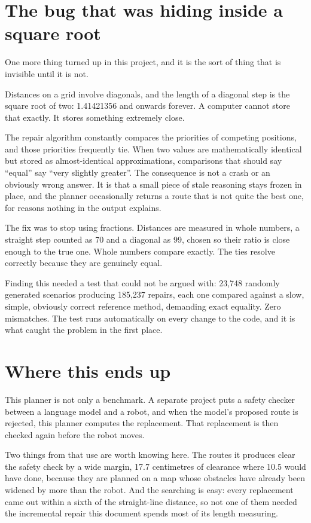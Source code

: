 \documentclass[11pt,a4paper]{article}
\begin{document}
\section{The bug that was hiding inside a square root}

One more thing turned up in this project, and it is the sort of thing that is invisible until it is not.

Distances on a grid involve diagonals, and the length of a diagonal step is the square root of two: 1.41421356 and onwards forever. A computer cannot store that exactly. It stores something extremely close.

The repair algorithm constantly compares the priorities of competing positions, and those priorities frequently tie. When two values are mathematically identical but stored as almost-identical approximations, comparisons that should say ``equal'' say ``very slightly greater''. The consequence is not a crash or an obviously wrong answer. It is that a small piece of stale reasoning stays frozen in place, and the planner occasionally returns a route that is not quite the best one, for reasons nothing in the output explains.

The fix was to stop using fractions. Distances are measured in whole numbers, a straight step counted as 70 and a diagonal as 99, chosen so their ratio is close enough to the true one. Whole numbers compare exactly. The ties resolve correctly because they are genuinely equal.

\begin{quotebox}
Finding this needed a test that could not be argued with: 23,748 randomly generated scenarios producing 185,237 repairs, each one compared against a slow, simple, obviously correct reference method, demanding exact equality. Zero mismatches. The test runs automatically on every change to the code, and it is what caught the problem in the first place.
\end{quotebox}

\section{Where this ends up}

This planner is not only a benchmark. A separate project puts a safety checker between a language model and a robot, and when the model's proposed route is rejected, this planner computes the replacement. That replacement is then checked again before the robot moves.

Two things from that use are worth knowing here. The routes it produces clear the safety check by a wide margin, 17.7 centimetres of clearance where 10.5 would have done, because they are planned on a map whose obstacles have already been widened by more than the robot. And the searching is easy: every replacement came out within a sixth of the straight-line distance, so not one of them needed the incremental repair this document spends most of its length measuring.
\end{document}
